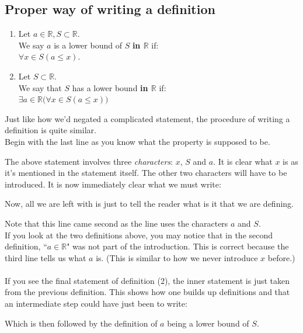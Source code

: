\hrulefill
{}

\hrulefill

\subsection{Proper way of writing a definition}\label{ssec:properdef}
\nopagebreak
\begin{enumerate}[label=(\arabic*)]
    \item Let $a\in \mathbb{R}, S\subset \mathbb{R}.$\\
    We say $a$ is a lower bound of $S$ \textbf{in $\mathbb{R}$} if:\\
    $\forall x \in S(a \le x).$
    \item Let $S\subset \mathbb{R}$.\\
    We say that $S$ has a lower bound \textbf{in $\mathbb{R}$} if:\\
    $\exists a \in \mathbb{R}\big(\forall x \in S(a \le x)\big)$
\end{enumerate}

Just like how we'd negated a complicated statement, the procedure of writing a definition is quite similar.\\
Begin with the last line as you know what the property is supposed to be. 
\begin{center}
\end{center}
The above statement involves three \textit{characters}: $x$, $S$ and $a$. It is clear what $x$ is as it's mentioned in the statement itself. The other two characters will have to be introduced. It is now immediately clear what we must write:
\begin{center}
\end{center}
Now, all we are left with is just to tell the reader what is it that we are defining.
\begin{center}
\end{center}
Note that this line came second as the line uses the characters $a$ and $S$.\\
If you look at the two definitions above, you may notice that in the second definition, ``$a\in \mathbb{R}$" was not part of the introduction. This is correct because the third line tells us what $a$ is. (This is similar to how we never introduce $x$ before.)\\~\\
If you see the final statement of definition (2), the inner statement is just taken from the previous definition. This shows how one builds up definitions and that an intermediate step could have just been to write:
\begin{center}
\end{center}
Which is then followed by the definition of $a$ being a lower bound of $S$.
%
